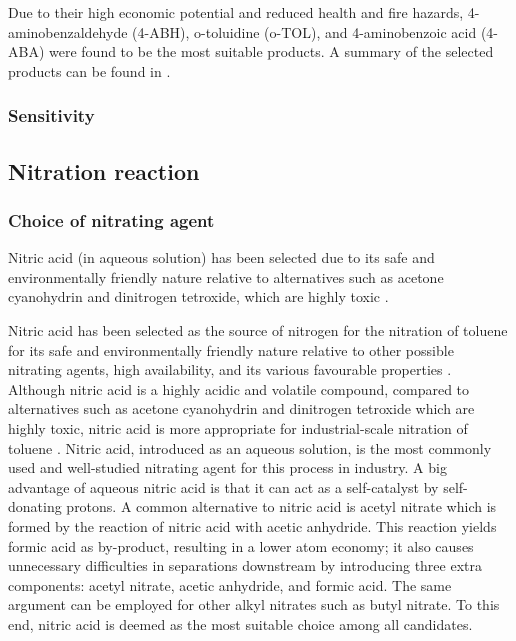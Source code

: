 Due to their high economic potential and reduced health and fire hazards, 4-aminobenzaldehyde (4-ABH), o-toluidine (o-TOL), and 4-aminobenzoic acid (4-ABA) were found to be the most suitable products. A  summary of the selected products can be found in .


\subsubsection{Sensitivity}

\subsection{Nitration reaction}

\subsubsection{Choice of nitrating agent}
Nitric acid (in aqueous solution) has been selected due to its safe and environmentally friendly nature relative to alternatives such as acetone cyanohydrin and dinitrogen tetroxide, which are highly toxic \cite{miller_kinetics_1964,dagade_nitration_2002, sreedhar_scientific_2013}. 

Nitric acid has been selected as the source of nitrogen for the nitration of toluene for its safe and environmentally friendly nature relative to other possible nitrating agents, high availability, and its various favourable properties \cite{miller_kinetics_1964, sreedhar_scientific_2013}. Although nitric acid is a highly acidic and volatile compound, compared to alternatives such as acetone cyanohydrin and dinitrogen tetroxide which are highly toxic, nitric acid is more appropriate for industrial-scale nitration of toluene \cite{dagade_nitration_2002, sreedhar_scientific_2013}. Nitric acid, introduced as an aqueous solution, is the most commonly used and well-studied nitrating agent for this process in industry. \cite{bowers_toluidines_2000} A big advantage of aqueous nitric acid is that it can act as a self-catalyst by self-donating protons. \cite{miller_kinetics_1964} A common alternative to nitric acid is acetyl nitrate which is formed by the reaction of nitric acid with acetic anhydride. \cite{vassena_selective_1999} This reaction yields formic acid as by-product, resulting in a lower atom economy; it also causes unnecessary difficulties in separations downstream by introducing three extra components: acetyl nitrate, acetic anhydride, and formic acid. The same argument can be employed for other alkyl nitrates such as butyl nitrate. To this end, nitric acid is deemed as the most suitable choice among all candidates.


